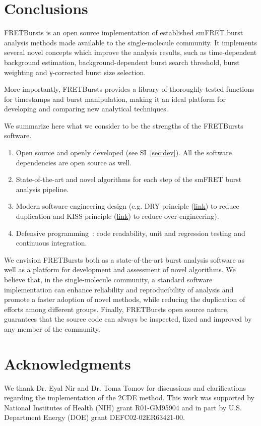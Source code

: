 \section{Conclusions}
\label{sec:conclusions}

FRETBursts is an open source implementation of established smFRET burst analysis methods
made available to the single-molecule community.
It implements several novel concepts which improve the analysis results, such as
time-dependent background estimation, background-dependent burst search threshold,
burst weighting and γ-corrected burst size selection.

More importantly, FRETBursts provides a library of thoroughly-tested functions
for timestamps and burst manipulation, making it an ideal platform for
developing and comparing new analytical techniques.

We summarize here what we consider to be the strengths
of the FRETBursts software.

\begin{enumerate}
\item Open source and openly developed (see SI~\ref{sec:dev}).
All the software dependencies are open source as well.
\item State-of-the-art and novel algorithms for each step of the
smFRET burst analysis pipeline.
\item Modern software engineering design (e.g. DRY principle
(\href{http://en.wikipedia.org/wiki/Don\%27t_repeat_yourself}{link})
to reduce duplication and KISS principle
(\href{http://en.wikipedia.org/wiki/KISS_principle}{link})
to reduce over-engineering).
\item Defensive programming~\cite{Prli__2012}: code readability,
unit and regression testing and continuous integration.
\end{enumerate}

We envision FRETBursts both as a state-of-the-art burst analysis
software as well as a platform for development and assessment of novel algorithms.
We believe that, in the single-molecule community,
a standard software implementation can enhance
reliability and reproducibility of analysis and promote a faster adoption of novel methods, 
while reducing the duplication of efforts among different groups.
Finally, FRETBursts open source nature, guarantees that the source code
can always be inspected, fixed and improved by any member of the community.

\section*{Acknowledgments}
We thank Dr. Eyal Nir and Dr. Toma Tomov for discussions and clarifications regarding the 
implementation of the 2CDE method.
This work was supported by National Institutes of Health (NIH)
grant R01-GM95904 and in part by U.S. Department Energy (DOE) grant DEFC02-02ER63421-00.

